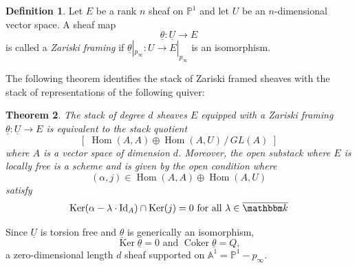 \documentclass{amsart}
\newtheorem{theorem}{Theorem}[section]
\theoremstyle{definition}
\newtheorem{definition}[theorem]{Definition}
\newcommand{\kk} {{\mathbbm k}}
\renewcommand{\AA} {{\mathbb A}}
\newcommand{\PP}{\mathbb{P}}
\newcommand{\Hom}{\operatorname{Hom}}
\newcommand{\Ker}{\operatorname{Ker}}
\newcommand{\Coker}{\operatorname{Coker}}
\newcommand{\UL}[1]{\underline{#1}}
\newcommand{\Id}{\operatorname{Id}}
\begin{document}
\begin{definition}\label{defn: Zariski framing}
Let $E$ be a rank $n$ sheaf on $\PP^{1}$ and let $U$ be an
$n$-dimensional vector space. A sheaf map 
\[
\UL{\theta}: \UL{U}\to E
\]
is called a \emph{Zariski framing} if $\UL{\theta}|_{p_{\infty}}:U \to
E|_{p_{\infty}}$ is an isomorphism.
\end{definition}

The following theorem identifies the stack of Zariski framed sheaves
with the stack of representations of the following quiver:

\begin{center}
\end{center}

\begin{theorem}\label{thm: stack of Zariski framed sheaves is
equivalent to stack of quiver representation}
The stack of degree $d$ sheaves $E$ equipped with a Zariski framing
$\UL{\theta}: \UL{U}\to E$ is equivalent to the stack quotient
\[
[\,\,\Hom (A,A)\oplus \Hom (A,U) \,/\, GL(A)\,\, ]
\]
where $A$ is a vector space of dimension $d$. Moreover, the open
substack where $E$ is locally free is a scheme and is given by the
open condition where 
\[
(\alpha ,j)\in \Hom (A,A)\oplus \Hom (A,U) 
\]
satisfy 
\begin{equation}\label{eqn: open condition involving ker j}
\Ker (\alpha -\lambda \cdot \Id_{A})\cap \Ker (j) = 0\text{ for all }\lambda \in \overline{\kk }
\end{equation}
\end{theorem}

\proof Since $\UL{U}$ is torsion free and $\UL{\theta}$ is generically
an isomorphism,
\[
\Ker \UL{\theta}=0\text{ and } \Coker \UL{\theta}=Q ,
\]
a zero-dimensional length $d$ sheaf supported on $\AA^1=\PP^{1}-p_{\infty}$.
\end{document}
